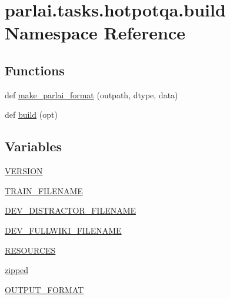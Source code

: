 \hypertarget{namespaceparlai_1_1tasks_1_1hotpotqa_1_1build}{}\section{parlai.\+tasks.\+hotpotqa.\+build Namespace Reference}
\label{namespaceparlai_1_1tasks_1_1hotpotqa_1_1build}
\subsection*{Functions}
\begin{DoxyCompactItemize}
\item 
def \hyperlink{namespaceparlai_1_1tasks_1_1hotpotqa_1_1build_a11cd6bdcce0c267fa7bebb496d930b44}{make\+\_\+parlai\+\_\+format} (outpath, dtype, data)
\item 
def \hyperlink{namespaceparlai_1_1tasks_1_1hotpotqa_1_1build_a98853aa474b04fb50fa49cec3f1c3882}{build} (opt)
\end{DoxyCompactItemize}
\subsection*{Variables}
\begin{DoxyCompactItemize}
\item 
\hyperlink{namespaceparlai_1_1tasks_1_1hotpotqa_1_1build_ab3907722aedfecf0109f562f0ee5b296}{V\+E\+R\+S\+I\+ON}
\item 
\hyperlink{namespaceparlai_1_1tasks_1_1hotpotqa_1_1build_a1d7efa0c85b7749310fbf7ca9d2c23dc}{T\+R\+A\+I\+N\+\_\+\+F\+I\+L\+E\+N\+A\+ME}
\item 
\hyperlink{namespaceparlai_1_1tasks_1_1hotpotqa_1_1build_aa7e2799d6457989a1e42b12d83671eb4}{D\+E\+V\+\_\+\+D\+I\+S\+T\+R\+A\+C\+T\+O\+R\+\_\+\+F\+I\+L\+E\+N\+A\+ME}
\item 
\hyperlink{namespaceparlai_1_1tasks_1_1hotpotqa_1_1build_afeba3647a9d15060813343e1767dd5e1}{D\+E\+V\+\_\+\+F\+U\+L\+L\+W\+I\+K\+I\+\_\+\+F\+I\+L\+E\+N\+A\+ME}
\item 
\hyperlink{namespaceparlai_1_1tasks_1_1hotpotqa_1_1build_a662f331e569dc6935f88fdad1f7c507d}{R\+E\+S\+O\+U\+R\+C\+ES}
\item 
\hyperlink{namespaceparlai_1_1tasks_1_1hotpotqa_1_1build_ae498bb3da44c68db17976dbbc1410ee9}{zipped}
\item 
\hyperlink{namespaceparlai_1_1tasks_1_1hotpotqa_1_1build_ab458a3d507d099614796ea26b47bcaa8}{O\+U\+T\+P\+U\+T\+\_\+\+F\+O\+R\+M\+AT}
\end{DoxyCompactItemize}


